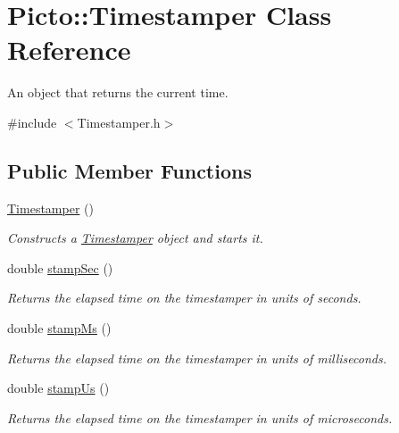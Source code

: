 \hypertarget{class_picto_1_1_timestamper}{\section{Picto\-:\-:Timestamper Class Reference}
\label{class_picto_1_1_timestamper}
}


An object that returns the current time.  




{\ttfamily \#include $<$Timestamper.\-h$>$}

\subsection*{Public Member Functions}
\begin{DoxyCompactItemize}
\item 
\hypertarget{class_picto_1_1_timestamper_a19af9547244d25d5c09ccb7f11955f17}{\hyperlink{class_picto_1_1_timestamper_a19af9547244d25d5c09ccb7f11955f17}{Timestamper} ()}\label{class_picto_1_1_timestamper_a19af9547244d25d5c09ccb7f11955f17}

\begin{DoxyCompactList}\small\item\em Constructs a \hyperlink{class_picto_1_1_timestamper}{Timestamper} object and starts it. \end{DoxyCompactList}\item 
\hypertarget{class_picto_1_1_timestamper_adb578b7bcfc1c09761c32eed628ab735}{double \hyperlink{class_picto_1_1_timestamper_adb578b7bcfc1c09761c32eed628ab735}{stamp\-Sec} ()}\label{class_picto_1_1_timestamper_adb578b7bcfc1c09761c32eed628ab735}

\begin{DoxyCompactList}\small\item\em Returns the elapsed time on the timestamper in units of seconds. \end{DoxyCompactList}\item 
\hypertarget{class_picto_1_1_timestamper_a64b88eaa050cab52581043a779cf90f7}{double \hyperlink{class_picto_1_1_timestamper_a64b88eaa050cab52581043a779cf90f7}{stamp\-Ms} ()}\label{class_picto_1_1_timestamper_a64b88eaa050cab52581043a779cf90f7}

\begin{DoxyCompactList}\small\item\em Returns the elapsed time on the timestamper in units of milliseconds. \end{DoxyCompactList}\item 
\hypertarget{class_picto_1_1_timestamper_aa5cd3b8e67c2f28daff1de9af2f059c3}{double \hyperlink{class_picto_1_1_timestamper_aa5cd3b8e67c2f28daff1de9af2f059c3}{stamp\-Us} ()}\label{class_picto_1_1_timestamper_aa5cd3b8e67c2f28daff1de9af2f059c3}

\begin{DoxyCompactList}\small\item\em Returns the elapsed time on the timestamper in units of microseconds. \end{DoxyCompactList}\end{DoxyCompactItemize}
